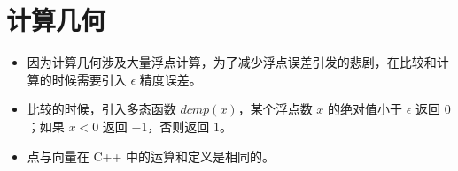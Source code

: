 \chapter{计算几何}

\begin{itemize}
    \item 因为计算几何涉及大量浮点计算，为了减少浮点误差引发的悲剧，在比较和计算的时候需要引入 $\epsilon$ 精度误差。
    \item 比较的时候，引入多态函数 $dcmp(x)$，某个浮点数 $x$ 的绝对值小于 $\epsilon$ 返回 $0$；如果 $x < 0$ 返回 $-1$，否则返回 $1$。
    \item 点与向量在 C++ 中的运算和定义是相同的。
\end{itemize}

























